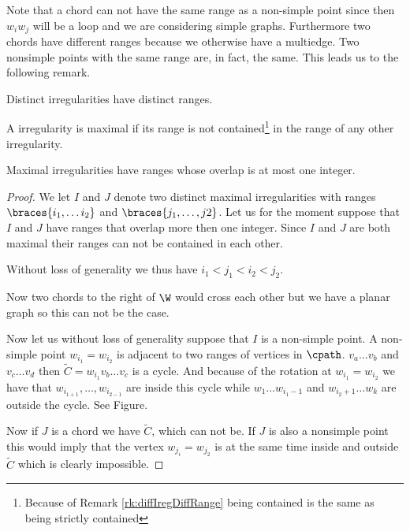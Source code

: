   Note that a chord can not have the same range as a non-simple point since then $w_i w_j$ will be a loop and we are considering simple graphs. Furthermore two chords have different ranges because we otherwise have a multiedge. Two nonsimple points with the same range are, in fact, the same. This leads us to the following remark.
  \begin{remark}
  \label{rk:diffIregDiffRange}
  Distinct irregularities have distinct ranges.
  \end{remark}

  \begin{defi}
  A irregularity is maximal if its range is not contained\footnote{Because of Remark \ref{rk:diffIregDiffRange} being contained is the same as being strictly contained} in the range of any other irregularity.
  \end{defi}

  \begin{lemma}
  \label{lm:rangeOverlap}
  Maximal irregularities have ranges whose overlap is at most one integer.
  \end{lemma}
  \begin{proof}
  We let $I$ and $J$ denote two distinct maximal irregularities with ranges $\braces{i_1, \ldots i_2}$ and $\braces{j_1, \ldots, j2}$. Let us for the moment suppose that $I$ and $J$ have ranges that overlap more then one integer. Since $I$ and $J$ are both maximal their ranges can not be contained in each other.

  Without loss of generality we thus have $i_1 < j_1 < i_2 < j_2$.

  Now two chords to the right of $\W$ would cross each other but we have a planar graph so this can not be the case.

  Now let us without loss of generality suppose that $I$ is a non-simple point. A non-simple point $w_{i_1} = w_{i_2}$ is adjacent to two ranges of vertices in $\cpath$. $v_a \ldots v_b$ and $v_c \ldots v_d$
  then $\tilde{C} = w_{i_1} v_b \ldots v_c$ is a cycle. And because of the rotation at $w_{i_1} = w_{i_2}$ we have that $w_{i_{1 +1}}, \ldots, w_{i_{2 -1}}$ are inside this cycle while $w_1 \ldots w_{i_1 -1}$ and $ w_{i_2 +1} \ldots w_k$ are outside the cycle. See Figure.

  Now if $J$ is a chord we have $\tilde{C}$, which can not be. If $J$ is also a nonsimple point this would imply that the vertex $w_{j_i} = w_{j_2}$ is at the same time inside and outside $\tilde{C}$ which is clearly impossible.
  \end{proof}

